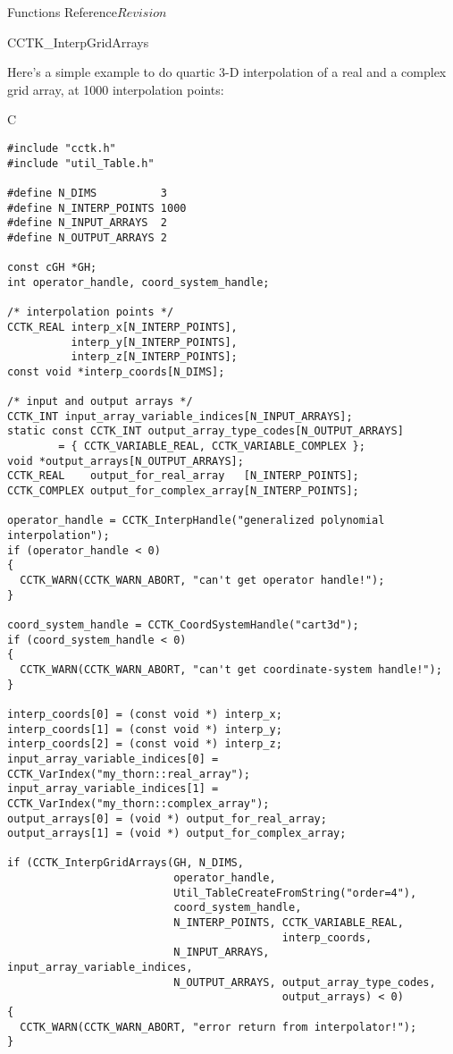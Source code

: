 \begin{cactuspart}{ Functions Reference}{}{$Revision$}
\begin{FunctionDescription}{CCTK\_InterpGridArrays}
\begin{ExampleSection}
\begin{ExampleDescription}
Here's a simple example to do quartic 3-D interpolation of a real
and a complex grid array, at 1000 interpolation points:
\end{ExampleDescription}
\begin{Example}{C}
\begin{verbatim}
#include "cctk.h"
#include "util_Table.h"

#define N_DIMS          3
#define N_INTERP_POINTS 1000
#define N_INPUT_ARRAYS  2
#define N_OUTPUT_ARRAYS 2

const cGH *GH;
int operator_handle, coord_system_handle;

/* interpolation points */
CCTK_REAL interp_x[N_INTERP_POINTS],
          interp_y[N_INTERP_POINTS],
          interp_z[N_INTERP_POINTS];
const void *interp_coords[N_DIMS];

/* input and output arrays */
CCTK_INT input_array_variable_indices[N_INPUT_ARRAYS];
static const CCTK_INT output_array_type_codes[N_OUTPUT_ARRAYS]
        = { CCTK_VARIABLE_REAL, CCTK_VARIABLE_COMPLEX };
void *output_arrays[N_OUTPUT_ARRAYS];
CCTK_REAL    output_for_real_array   [N_INTERP_POINTS];
CCTK_COMPLEX output_for_complex_array[N_INTERP_POINTS];

operator_handle = CCTK_InterpHandle("generalized polynomial interpolation");
if (operator_handle < 0)
{
  CCTK_WARN(CCTK_WARN_ABORT, "can't get operator handle!");
}

coord_system_handle = CCTK_CoordSystemHandle("cart3d");
if (coord_system_handle < 0)
{
  CCTK_WARN(CCTK_WARN_ABORT, "can't get coordinate-system handle!");
}

interp_coords[0] = (const void *) interp_x;
interp_coords[1] = (const void *) interp_y;
interp_coords[2] = (const void *) interp_z;
input_array_variable_indices[0] = CCTK_VarIndex("my_thorn::real_array");
input_array_variable_indices[1] = CCTK_VarIndex("my_thorn::complex_array");
output_arrays[0] = (void *) output_for_real_array;
output_arrays[1] = (void *) output_for_complex_array;

if (CCTK_InterpGridArrays(GH, N_DIMS,
                          operator_handle,
                          Util_TableCreateFromString("order=4"),
                          coord_system_handle,
                          N_INTERP_POINTS, CCTK_VARIABLE_REAL,
                                           interp_coords,
                          N_INPUT_ARRAYS, input_array_variable_indices,
                          N_OUTPUT_ARRAYS, output_array_type_codes,
                                           output_arrays) < 0)
{
  CCTK_WARN(CCTK_WARN_ABORT, "error return from interpolator!");
}
\end{verbatim}
\end{Example}
\end{ExampleSection}
\end{FunctionDescription}


\end{cactuspart}
